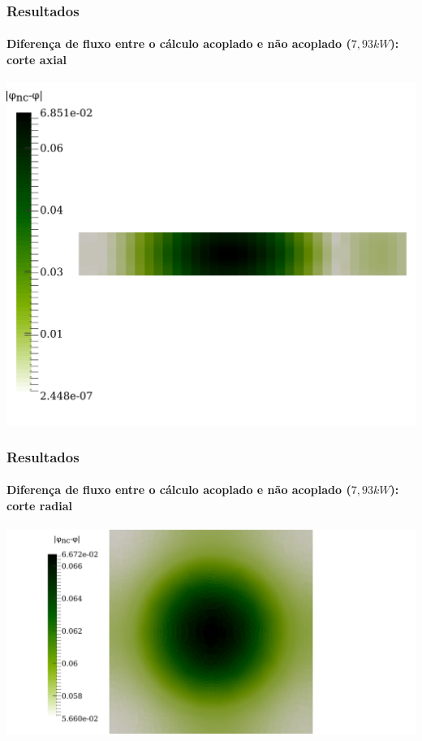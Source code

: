 \documentclass[svgnames,smaller,table]{beamer}
\begin{document}
\begin{frame}
  \frametitle{Resultados}
  \framesubtitle{Diferença de fluxo entre o cálculo acoplado e não acoplado ($7,93 kW$): corte axial}
  \centering\includegraphics[scale=0.5]{../figuras/diff-flux-axial.png}
\end{frame}

\begin{frame}
  \frametitle{Resultados}
  \framesubtitle{Diferença de fluxo entre o cálculo acoplado e não acoplado ($7,93 kW$): corte radial}
  \centering\includegraphics[scale=0.45]{../figuras/diff-flux-radial.png}
\end{frame}
\end{document}
